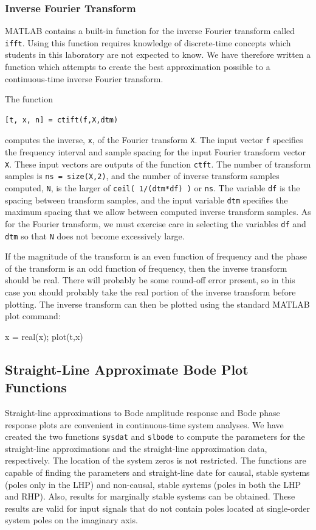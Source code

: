 \subsubsection{Inverse Fourier Transform}
MATLAB contains a built-in function for the inverse Fourier transform called \verb=ifft=.  Using this function requires knowledge of discrete-time concepts which students in this laboratory are not expected to know.  We have therefore written a function which attempts to create the best approximation possible to a continuous-time inverse Fourier transform.
\par
The function
\begin{verbatim}
[t, x, n] = ctift(f,X,dtm)
\end{verbatim}
computes the inverse, \verb=x=, of the Fourier transform \verb=X=.  The input vector \verb=f= specifies the frequency interval and sample spacing for the input Fourier transform vector \verb=X=.  These input vectors are outputs of the function \verb=ctft=.  The number of transform samples is \verb#ns = size(X,2)#, and the number of inverse transform samples computed, \verb=N=, is the larger of \verb=ceil( 1/(dtm*df) )= or \verb=ns=.  The variable \verb=df= is the spacing between transform samples, and the input variable \verb=dtm= specifies the maximum spacing that we allow between computed inverse transform samples.  As for the Fourier transform, we must exercise care in selecting the variables \verb=df= and \verb=dtm= so that \verb=N= does not become excessively large.
\par
If the magnitude of the transform is an even function of frequency and the phase of the transform is an odd function of frequency, then the inverse transform should be real.  There will probably be some round-off error present, so in this case you should probably take the real portion of the inverse transform before plotting.  The inverse transform can then be plotted using the standard MATLAB plot command:

\begin{codex}
x = real(x);
plot(t,x)
\end{codex}

\subsection{Straight-Line Approximate Bode Plot Functions}
Straight-line approximations to Bode amplitude response and Bode phase response plots are convenient in continuous-time system analyses.  We have created the two functions \verb=sysdat= and \verb=slbode= to compute the parameters for the straight-line approximations and the straight-line approximation data, respectively.  The location of the system zeros is not restricted.  The functions are capable of finding the parameters and straight-line date for causal, stable systems (poles only in the LHP) and non-causal, stable systems (poles in both the LHP and RHP).  Also, results for marginally stable systems can be obtained.  These results are valid for input signals that do not contain poles located at single-order system poles on the imaginary axis.

